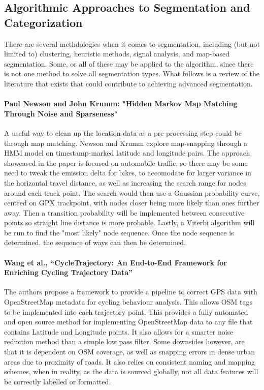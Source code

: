\documentclass[12pt,a4paper]{report}
\begin{document}
\subsection{Algorithmic Approaches to Segmentation and Categorization}
There are several methdologies when it comes to segmentation, including (but not limited to) clustering, heuristic methods, signal analysis, and map-based segmentation. Some, or all of these may be
applied to the algorithm, since there is not one method to solve all segmentation types. What follows is a review of the literature that exists that could contribute to
achieving advanced segmentation.


\paragraph{Paul Newson and John Krumm: "Hidden Markov Map Matching Through Noise and Sparseness"}
A useful way to clean up the location data as a pre-processing step could be through map matching. Newson and Krumm explore map-snapping through a HMM model on timestamp-marked latitude and longitude pairs.
The approach showcased in the paper is focused on automobile traffic, so there may be some need to tweak the emission delta for bikes, to accomodate for larger variance in the horizontal travel distance, as well as increasing
the search range for nodes around each track point. The search would then use a Gaussian probability curve, centred on GPX trackpoint, with nodes closer being more likely than ones further away. Then a transition probability will be implemented between consecutive points
so straight line distance is more probable. Lastly, a Viterbi algorithm will be run to find the "most likely" node sequence.
Once the node sequence is determined, the sequence of ways can then be determined.

\paragraph{Wang et al., “CycleTrajectory: An End-to-End Framework for Enriching Cycling Trajectory Data”}
The authors propose a framework to provide a pipeline to correct GPS data with OpenStreetMap metadata for cycling behaviour analysis. This allows
OSM tags to be implemented into each trajectory point. This provides a fully automated and open source method for implementing OpenStreetMap data to any file that contains Latitude and Longitude points.
It also allows for a smarter noise reduction method than a simple low pass filter. Some downsides however, are that it is dependent on OSM coverage, as well as snapping errors in dense urban areas due to proximity of roads. It also relies on consistent naming and mapping schemes, when
in reality, as the data is sourced globally, not all data features will be correctly labelled or formatted.
\end{document}
